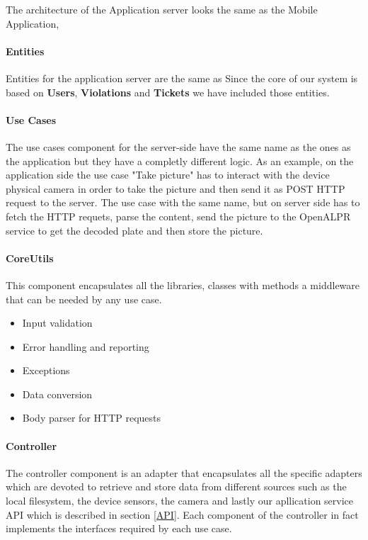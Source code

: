 The architecture of the Application server looks the same as the Mobile Application,

\paragraph{Entities}
Entities for the application server are the same as
Since the core of our system is based on \textbf{Users}, \textbf{Violations} and \textbf{Tickets} we have included those entities.


\paragraph{Use Cases}
The use cases component for the server-side have the same name as the ones as the application but they have a completly different logic. As an example, on the application side the use case "Take picture" has to interact with the device physical camera in order to take the picture and then send it as POST HTTP request to the server. The use case with the same name, but on server side has to fetch the HTTP requets, parse the content, send the picture to the OpenALPR service to get the decoded plate and then store the picture.

\paragraph{CoreUtils}
This component encapsulates all the libraries, classes with methods a middleware that can be needed by any use case.
\begin{itemize}
  \item Input validation
  \item Error handling and reporting
  \item Exceptions
  \item Data conversion
  \item Body parser for HTTP requests
\end{itemize}



\paragraph{Controller}

The controller component is an adapter that encapsulates all the specific adapters which are devoted to retrieve and store data from different sources such as the local filesystem, the device sensors, the camera and lastly our apllication service API which is described in section \ref{API}.
Each component of the controller in fact implements the interfaces required by each use case.


